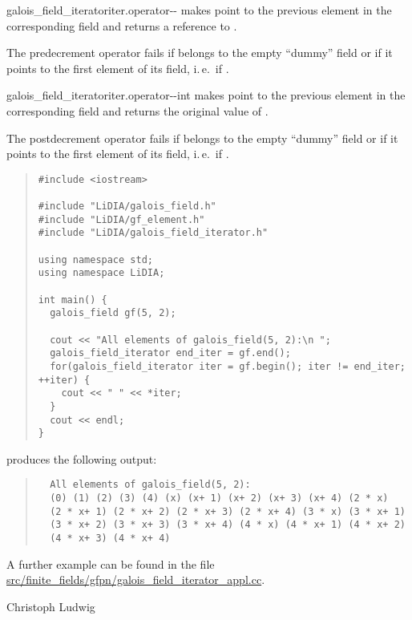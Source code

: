 \begin{fcode}{galois_field_iterator}{iter.operator-{}-}{}
   makes  point to the previous element in
  the corresponding field and returns a reference to .

  The predecrement operator fails if  belongs to the empty
  ``dummy'' field or if it points to the first element of its field, i.\,e.\
  if .
\end{fcode}

\begin{fcode}{galois_field_iterator}{iter.operator-{}-}{int}
   makes  point to the previous element in
  the corresponding field and returns the original value of .

  The postdecrement operator fails if  belongs to the empty
  ``dummy'' field or if it points to the first element of its field, i.\,e.\
  if .
\end{fcode}


\SEEALSO




\EXAMPLES

\begin{quote}
\begin{verbatim}
#include <iostream>

#include "LiDIA/galois_field.h"
#include "LiDIA/gf_element.h"
#include "LiDIA/galois_field_iterator.h"

using namespace std;
using namespace LiDIA;

int main() {
  galois_field gf(5, 2);

  cout << "All elements of galois_field(5, 2):\n ";
  galois_field_iterator end_iter = gf.end();
  for(galois_field_iterator iter = gf.begin(); iter != end_iter; ++iter) {
    cout << " " << *iter;
  }
  cout << endl;
}
\end{verbatim}
\end{quote}
produces the following output:
\begin{quote}
\begin{verbatim}
  All elements of galois_field(5, 2):
  (0) (1) (2) (3) (4) (x) (x+ 1) (x+ 2) (x+ 3) (x+ 4) (2 * x) 
  (2 * x+ 1) (2 * x+ 2) (2 * x+ 3) (2 * x+ 4) (3 * x) (3 * x+ 1)
  (3 * x+ 2) (3 * x+ 3) (3 * x+ 4) (4 * x) (4 * x+ 1) (4 * x+ 2)
  (4 * x+ 3) (4 * x+ 4)
\end{verbatim}
\end{quote}

A further example can be found in the file
\url{src/finite_fields/gfpn/galois_field_iterator_appl.cc}.

\AUTHOR

Christoph Ludwig

